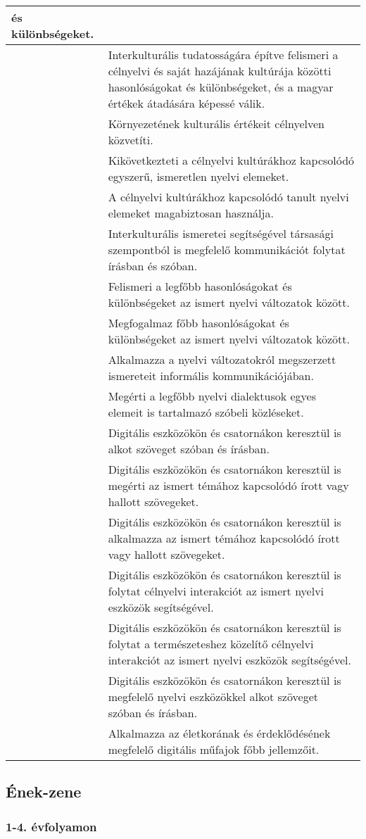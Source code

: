 \begin{longtable}[]{p{\evflength}@{\strut}>{\begin{minipage}{\columnlength}\strut}l<{\strut\end{minipage}}}
  és különbségeket.
\tabularnewline
\hline
&
  Interkulturális tudatosságára építve felismeri a célnyelvi és saját
  hazájának kultúrája közötti hasonlóságokat és különbségeket, és a
  magyar értékek átadására képessé válik.
\tabularnewline
\hline
&
  Környezetének kulturális értékeit célnyelven közvetíti.
\tabularnewline
\hline
&
  Kikövetkezteti a célnyelvi kultúrákhoz kapcsolódó egyszerű, ismeretlen
  nyelvi elemeket.
\tabularnewline
\hline
&
  A célnyelvi kultúrákhoz kapcsolódó tanult nyelvi elemeket magabiztosan
  használja.
\tabularnewline
\hline
&
  Interkulturális ismeretei segítségével társasági szempontból is
  megfelelő kommunikációt folytat írásban és szóban.
\tabularnewline
\hline
&
  Felismeri a legfőbb hasonlóságokat és különbségeket az ismert nyelvi
  változatok között.
\tabularnewline
\hline
&
  Megfogalmaz főbb hasonlóságokat és különbségeket az ismert nyelvi
  változatok között.
\tabularnewline
\hline
&
  Alkalmazza a nyelvi változatokról megszerzett ismereteit informális
  kommunikációjában.
\tabularnewline
\hline
&
  Megérti a legfőbb nyelvi dialektusok egyes elemeit is tartalmazó
  szóbeli közléseket.
\tabularnewline
\hline
&
  Digitális eszközökön és csatornákon keresztül is alkot szöveget szóban
  és írásban.
\tabularnewline
\hline
&
  Digitális eszközökön és csatornákon keresztül is megérti az ismert
  témához kapcsolódó írott vagy hallott szövegeket.
\tabularnewline
\hline
&
  Digitális eszközökön és csatornákon keresztül is alkalmazza az ismert
  témához kapcsolódó írott vagy hallott szövegeket.
\tabularnewline
\hline
&
  Digitális eszközökön és csatornákon keresztül is folytat célnyelvi
  interakciót az ismert nyelvi eszközök segítségével.
\tabularnewline
\hline
&
  Digitális eszközökön és csatornákon keresztül is folytat a
  természeteshez közelítő célnyelvi interakciót az ismert nyelvi
  eszközök segítségével.
\tabularnewline
\hline
&
  Digitális eszközökön és csatornákon keresztül is megfelelő nyelvi
  eszközökkel alkot szöveget szóban és írásban.
\tabularnewline
\hline
&
  Alkalmazza az életkorának és érdeklődésének megfelelő digitális
  műfajok főbb jellemzőit.
\tabularnewline
\hline
\end{longtable}

\hypertarget{enek-zene}{%
\subsection{Ének-zene}\label{enek-zene}}

\hypertarget{evfolyamon-11}{%
\subsubsection{1-4. évfolyamon}\label{evfolyamon-11}}

